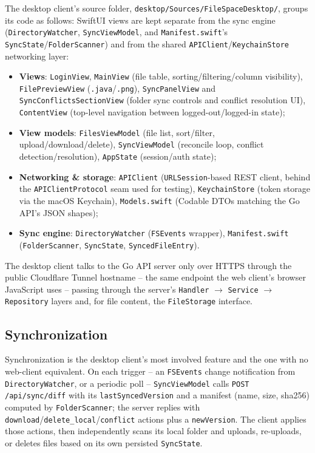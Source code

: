 \documentclass[12pt,a4paper]{article}
\begin{document}
The desktop client's source folder, \texttt{desktop/Sources/\allowbreak FileSpaceDesktop/}, groups its code as follows: SwiftUI views are kept separate from the sync engine (\texttt{DirectoryWatcher}, \texttt{SyncViewModel}, and \texttt{Manifest.swift}'s \texttt{SyncState}/\texttt{FolderScanner}) and from the shared \texttt{APIClient}/\texttt{KeychainStore} networking layer:

\begin{itemize}[nosep]
    \item \textbf{Views}: \texttt{LoginView}, \texttt{MainView} (file table, sorting/filtering/column visibility), \texttt{FilePreviewView} (\texttt{.java}/\texttt{.png}), \texttt{SyncPanelView} and \texttt{SyncConflicts\allowbreak SectionView} (folder sync controls and conflict resolution UI), \texttt{ContentView} (top-level navigation between logged-out/logged-in state);
    \item \textbf{View models}: \texttt{FilesViewModel} (file list, sort/filter, upload/download/delete), \texttt{SyncViewModel} (reconcile loop, conflict detection/resolution), \texttt{AppState} (session/auth state);
    \item \textbf{Networking \& storage}: \texttt{APIClient} (\texttt{URLSession}-based REST client, behind the \texttt{APIClientProtocol} seam used for testing), \texttt{KeychainStore} (token storage via the macOS Keychain), \texttt{Models.swift} (Codable DTOs matching the Go API's JSON shapes);
    \item \textbf{Sync engine}: \texttt{DirectoryWatcher} (\texttt{FSEvents} wrapper), \texttt{Manifest.swift} (\texttt{FolderScanner}, \texttt{SyncState}, \texttt{SyncedFileEntry}).
\end{itemize}

The desktop client talks to the Go API server only over HTTPS through the public Cloudflare Tunnel hostname -- the same endpoint the web client's browser JavaScript uses -- passing through the server's \texttt{Handler} $\to$ \texttt{Service} $\to$ \texttt{Repository} layers and, for file content, the \texttt{FileStorage} interface.

\subsection{Synchronization}

Synchronization is the desktop client's most involved feature and the one with no web-client equivalent. On each trigger -- an \texttt{FSEvents} change notification from \texttt{DirectoryWatcher}, or a periodic poll -- \texttt{SyncViewModel} calls \texttt{POST /api/sync/diff} with its \texttt{lastSyncedVersion} and a manifest (name, size, sha256) computed by \texttt{FolderScanner}; the server replies with \texttt{download}/\texttt{delete\_local}/\texttt{conflict} actions plus a \texttt{newVersion}. The client applies those actions, then independently scans its local folder and uploads, re-uploads, or deletes files based on its own persisted \texttt{SyncState}.
\end{document}
